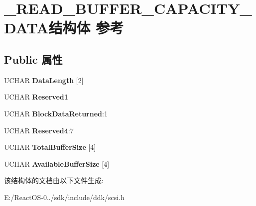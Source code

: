 \hypertarget{struct___r_e_a_d___b_u_f_f_e_r___c_a_p_a_c_i_t_y___d_a_t_a}{}\section{\+\_\+\+R\+E\+A\+D\+\_\+\+B\+U\+F\+F\+E\+R\+\_\+\+C\+A\+P\+A\+C\+I\+T\+Y\+\_\+\+D\+A\+T\+A结构体 参考}
\label{struct___r_e_a_d___b_u_f_f_e_r___c_a_p_a_c_i_t_y___d_a_t_a}
\subsection*{Public 属性}
\begin{DoxyCompactItemize}
\item 
\mbox{\label{struct___r_e_a_d___b_u_f_f_e_r___c_a_p_a_c_i_t_y___d_a_t_a_ade70248d60a637ec911173a6ad5c816a}} 
U\+C\+H\+AR {\bfseries Data\+Length} \mbox{[}2\mbox{]}
\item 
\mbox{\label{struct___r_e_a_d___b_u_f_f_e_r___c_a_p_a_c_i_t_y___d_a_t_a_a171effab380e17646d487a8f6f32b085}} 
U\+C\+H\+AR {\bfseries Reserved1}
\item 
\mbox{\label{struct___r_e_a_d___b_u_f_f_e_r___c_a_p_a_c_i_t_y___d_a_t_a_ab73988cba57e2e4ca93be6ff3d4819f3}} 
U\+C\+H\+AR {\bfseries Block\+Data\+Returned}\+:1
\item 
\mbox{\label{struct___r_e_a_d___b_u_f_f_e_r___c_a_p_a_c_i_t_y___d_a_t_a_aeb641fc24a1f6215a9d124216e845f2c}} 
U\+C\+H\+AR {\bfseries Reserved4}\+:7
\item 
\mbox{\label{struct___r_e_a_d___b_u_f_f_e_r___c_a_p_a_c_i_t_y___d_a_t_a_a0cfa022793e1d2f3c9d3f53e38fd17af}} 
U\+C\+H\+AR {\bfseries Total\+Buffer\+Size} \mbox{[}4\mbox{]}
\item 
\mbox{\label{struct___r_e_a_d___b_u_f_f_e_r___c_a_p_a_c_i_t_y___d_a_t_a_a4eb8c23b3bb5254b6e1a22ba89270ebd}} 
U\+C\+H\+AR {\bfseries Available\+Buffer\+Size} \mbox{[}4\mbox{]}
\end{DoxyCompactItemize}


该结构体的文档由以下文件生成\+:\begin{DoxyCompactItemize}
\item 
E\+:/\+React\+O\+S-\/0../sdk/include/ddk/scsi.\+h\end{DoxyCompactItemize}
